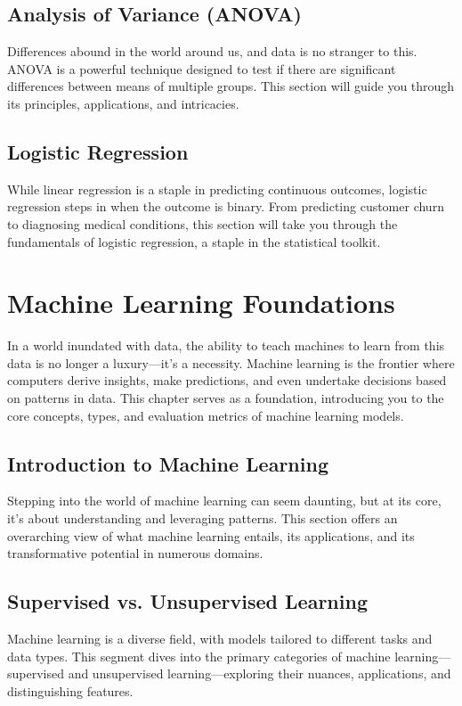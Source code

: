 \documentclass{book}
\begin{document}
\section{Analysis of Variance (ANOVA)}
Differences abound in the world around us, and data is no stranger to this. ANOVA is a powerful technique designed to test if there are significant differences between means of multiple groups. This section will guide you through its principles, applications, and intricacies.

\section{Logistic Regression}
While linear regression is a staple in predicting continuous outcomes, logistic regression steps in when the outcome is binary. From predicting customer churn to diagnosing medical conditions, this section will take you through the fundamentals of logistic regression, a staple in the statistical toolkit.

\chapter{Machine Learning Foundations}
In a world inundated with data, the ability to teach machines to learn from this data is no longer a luxury—it's a necessity. Machine learning is the frontier where computers derive insights, make predictions, and even undertake decisions based on patterns in data. This chapter serves as a foundation, introducing you to the core concepts, types, and evaluation metrics of machine learning models.

\section{Introduction to Machine Learning}
Stepping into the world of machine learning can seem daunting, but at its core, it's about understanding and leveraging patterns. This section offers an overarching view of what machine learning entails, its applications, and its transformative potential in numerous domains.

\section{Supervised vs. Unsupervised Learning}
Machine learning is a diverse field, with models tailored to different tasks and data types. This segment dives into the primary categories of machine learning—supervised and unsupervised learning—exploring their nuances, applications, and distinguishing features.
\end{document}
